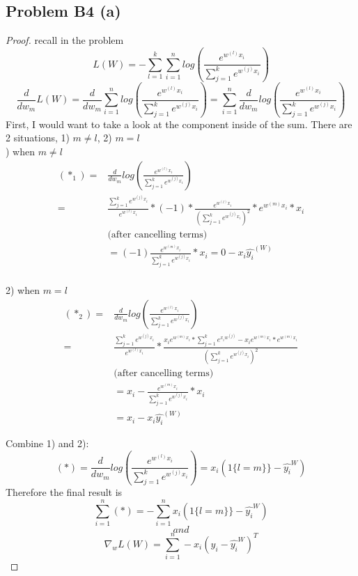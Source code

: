 \documentclass[12pt]{article}
\begin{document}
 \subsection*{Problem B4 (a)}
 \begin{proof}
         recall in the problem $$L(W) = - \sum_{l=1}^{k}\sum_{i=1}^{n}log(\frac{e^{w^{(l)}x_i}}{\sum_{j=1}^{k}e^{w^{(j)}x_i}}) $$
         $$\frac{d}{dw_m} L(W) = \frac{d}{dw_m}  \sum_{i=1}^{n}log(\frac{e^{w^{(l)}x_i}}{\sum_{j=1}^{k}e^{w^{(j)}x_i}}) = \sum_{i=1}^{n} \frac{d}{dw_m} log(\frac{e^{w^{(l)}x_i}}{\sum_{j=1}^{k}e^{w^{(j)}x_i}}) $$
         First, I would want to take a look at the component inside of the sum. There are 2 situations, 1) $m \neq l$,  2) $ m = l$\\

) when $m\neq l$\\
\[
\begin{aligned}
        (*_1)  =&  \frac{d}{dw_m} log(\frac{e^{w^{(l)}x_i}}{\sum_{j=1}^{k}e^{w^{(j)}x_i}})\\
        =& \frac{\sum_{j=1}^{k}e^{w^{(j)}x_i}}{e^{w^{(l)}x_i}}* (-1)* \frac{e^{w^{(l)}x_i}}{(\sum_{j=1}^{k}e^{w^{(j)}x_i})^2}*e^{w^{(m)} x_i}*x_i \\
         & \text{(after cancelling terms)}\\
         & = (-1) \frac{e^{w^{(m)}x_i}}{\sum_{j=1}^{k}e^{w^{(j)}x_i}} * x_i = 0 - x_i \widehat{y_i}^{(W)}\\
\end{aligned}
\]

2) when $m = l$
\[
\begin{aligned}
        (*_2)  =&  \frac{d}{dw_m} log(\frac{e^{w^{(l)}x_i}}{\sum_{j=1}^{k}e^{w^{(j)}x_i}})\\
=& \frac{\sum_{j=1}^{k}e^{w^{(j)}x_i}}{e^{w^{(l)}x_i}}*  \frac{x_ie^{w^{(m)}x_i} *\sum_{j=1}^{k} e^{x_iw^{(j)}} - x_ie^{w^{(m)}x_i} *e^{w^{(m)}x_i} }{(\sum_{j=1}^{k}e^{w^{(j)}x_i})^2}\\
         & \text{(after cancelling terms)}\\
         & = x_i - \frac{e^{w^{(m)}x_i}}{\sum_{j=1}^{k}e^{w^{(j)}x_i}} * x_i \\
         & = x_i - x_i \widehat{y_i}^{(W)}
\end{aligned}
\]

\newpage
Combine 1) and 2): \\ 
$$(*) = \frac{d}{dw_m} log(\frac{e^{w^{(l)}x_i}}{\sum_{j=1}^{k}e^{w^{(j)}x_i}})= x_i (1\{l=m\}\} - \widehat{y_i}^{W})$$
Therefore the final result is 
$$ \sum_{i=1}^{n}(*) = -\sum_{i=1}^{n} x_i (1\{l=m\}\} - \widehat{y_i}^{W})$$
$$and$$
$$\nabla_w L(W) = \sum_{i=1}^{n} -x_i (y_i- \widehat{y_i}^{W})^T$$
 \end{proof}
\end{document}
